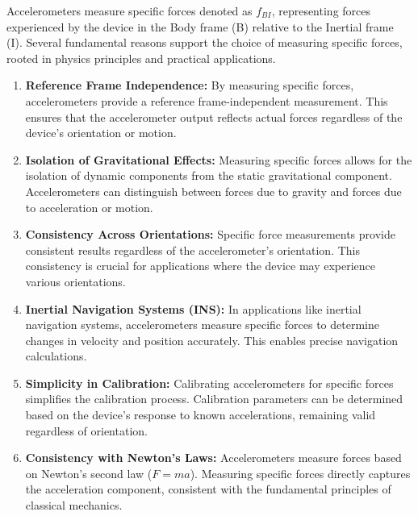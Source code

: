 Accelerometers measure specific forces denoted as \(f_{BI}\), representing forces experienced by the device in the Body frame (B) relative to the Inertial frame (I). Several fundamental reasons support the choice of measuring specific forces, rooted in physics principles and practical applications.

\begin{enumerate}
  \item \textbf{Reference Frame Independence:}
    By measuring specific forces, accelerometers provide a reference frame-independent measurement. This ensures that the accelerometer output reflects actual forces regardless of the device's orientation or motion.

  \item \textbf{Isolation of Gravitational Effects:}
    Measuring specific forces allows for the isolation of dynamic components from the static gravitational component. Accelerometers can distinguish between forces due to gravity and forces due to acceleration or motion.

  \item \textbf{Consistency Across Orientations:}
    Specific force measurements provide consistent results regardless of the accelerometer's orientation. This consistency is crucial for applications where the device may experience various orientations.

  \item \textbf{Inertial Navigation Systems (INS):}
    In applications like inertial navigation systems, accelerometers measure specific forces to determine changes in velocity and position accurately. This enables precise navigation calculations.

  \item \textbf{Simplicity in Calibration:}
    Calibrating accelerometers for specific forces simplifies the calibration process. Calibration parameters can be determined based on the device's response to known accelerations, remaining valid regardless of orientation.

  \item \textbf{Consistency with Newton's Laws:}
    Accelerometers measure forces based on Newton's second law (\(F = ma\)). Measuring specific forces directly captures the acceleration component, consistent with the fundamental principles of classical mechanics.
\end{enumerate}

